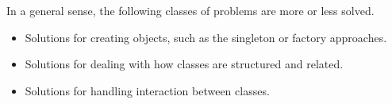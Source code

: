 \documentclass[12pt]{report}
\begin{document}
\begin{flushleft}
In a general sense, the following classes of problems are more or less solved.

\begin{itemize}
    \item Solutions for creating objects, such as the singleton or factory
        approaches.
    \item Solutions for dealing with how classes are structured and related.
    \item Solutions for handling interaction between classes.
\end{itemize}

\end{flushleft}
\end{document}
